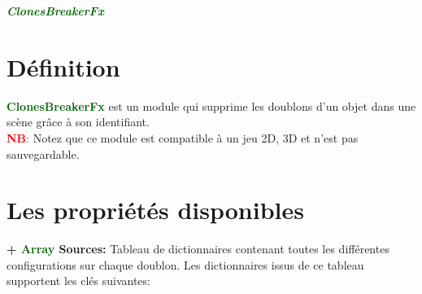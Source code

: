 \documentclass[a4paper, 11pt]{article}
\begin{document}
	\pagecolor{silver}
	\huge{\hspace{13cm}\textit{\textbf{\textcolor{darkgreen}{ClonesBreakerFx}}}}\large{} \tableofcontents
	\newpage
	\section{Définition}
	\textcolor{darkgreen}{\textbf{ClonesBreakerFx}} est un module qui supprime les doublons d'un objet dans
	une scène grâce à son identifiant.\\
	\textcolor{red}{\textbf{NB}:} Notez que ce module est compatible à un jeu 2D, 3D et n'est pas
	sauvegardable.

	\section{Les propriétés disponibles}
	\textbf{+ \textcolor{darkgreen}{Array} Sources:} Tableau de dictionnaires contenant toutes les 
	différentes configurations sur chaque doublon. Les dictionnaires issus de ce tableau supportent les clés
	suivantes:\\
\end{document}
